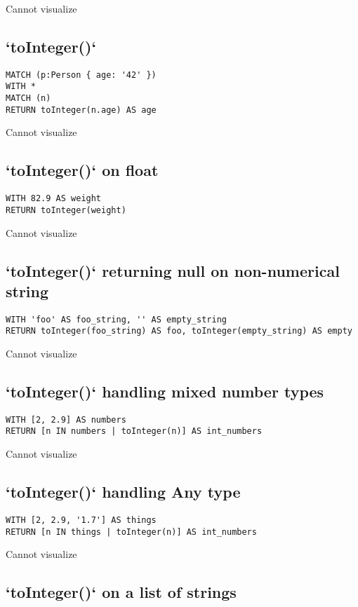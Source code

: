 Cannot visualize
\subsection{`toInteger()`}

\begin{lstlisting}
MATCH (p:Person { age: '42' })
WITH *
MATCH (n)
RETURN toInteger(n.age) AS age
\end{lstlisting}

Cannot visualize
\subsection{`toInteger()` on float}

\begin{lstlisting}
WITH 82.9 AS weight
RETURN toInteger(weight)
\end{lstlisting}

Cannot visualize
\subsection{`toInteger()` returning null on non-numerical string}

\begin{lstlisting}
WITH 'foo' AS foo_string, '' AS empty_string
RETURN toInteger(foo_string) AS foo, toInteger(empty_string) AS empty
\end{lstlisting}

Cannot visualize
\subsection{`toInteger()` handling mixed number types}

\begin{lstlisting}
WITH [2, 2.9] AS numbers
RETURN [n IN numbers | toInteger(n)] AS int_numbers
\end{lstlisting}

Cannot visualize
\subsection{`toInteger()` handling Any type}

\begin{lstlisting}
WITH [2, 2.9, '1.7'] AS things
RETURN [n IN things | toInteger(n)] AS int_numbers
\end{lstlisting}

Cannot visualize
\subsection{`toInteger()` on a list of strings}


